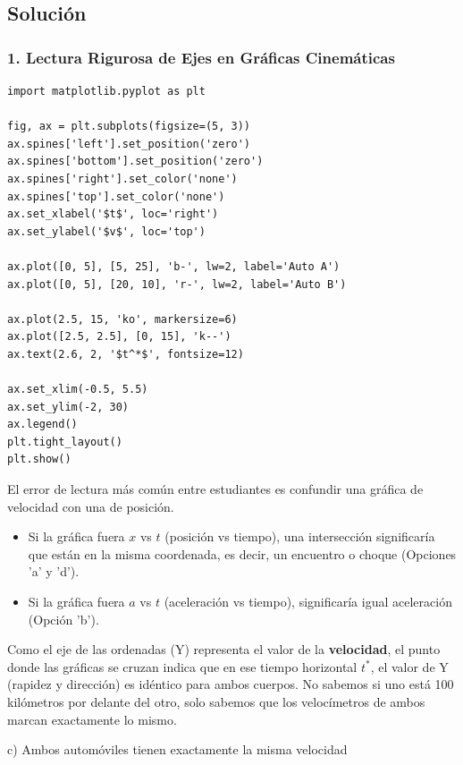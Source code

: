 \documentclass[12pt, a4paper]{article}
\begin{document}
\subsection*{Solución}

\subsubsection*{1. Lectura Rigurosa de Ejes en Gráficas Cinemáticas}

\begin{lstlisting}
import matplotlib.pyplot as plt

fig, ax = plt.subplots(figsize=(5, 3))
ax.spines['left'].set_position('zero')
ax.spines['bottom'].set_position('zero')
ax.spines['right'].set_color('none')
ax.spines['top'].set_color('none')
ax.set_xlabel('$t$', loc='right')
ax.set_ylabel('$v$', loc='top')

ax.plot([0, 5], [5, 25], 'b-', lw=2, label='Auto A')
ax.plot([0, 5], [20, 10], 'r-', lw=2, label='Auto B')

ax.plot(2.5, 15, 'ko', markersize=6)
ax.plot([2.5, 2.5], [0, 15], 'k--')
ax.text(2.6, 2, '$t^*$', fontsize=12)

ax.set_xlim(-0.5, 5.5)
ax.set_ylim(-2, 30)
ax.legend()
plt.tight_layout()
plt.show()
\end{lstlisting}

El error de lectura más común entre estudiantes es confundir una gráfica de velocidad con una de posición. 
\begin{itemize}
    \item Si la gráfica fuera $x$ vs $t$ (posición vs tiempo), una intersección significaría que están en la misma coordenada, es decir, un encuentro o choque (Opciones 'a' y 'd').
    \item Si la gráfica fuera $a$ vs $t$ (aceleración vs tiempo), significaría igual aceleración (Opción 'b').
\end{itemize}
Como el eje de las ordenadas (Y) representa el valor de la \textbf{velocidad}, el punto donde las gráficas se cruzan indica que en ese tiempo horizontal $t^*$, el valor de Y (rapidez y dirección) es idéntico para ambos cuerpos. No sabemos si uno está 100 kilómetros por delante del otro, solo sabemos que los velocímetros de ambos marcan exactamente lo mismo.

\begin{tcolorbox}[colback=green!5!white, colframe=green!50!black, title=Respuesta Final]
\centering \Large c) Ambos automóviles tienen exactamente la misma velocidad
\end{tcolorbox}
\end{document}
